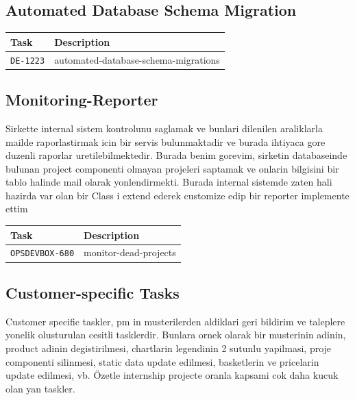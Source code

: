 \subsection*{Automated Database Schema Migration}
\begin{table}[H]
\centering
\begin{tabular}{p{4cm} p{10cm}}
\toprule
\textbf{Task} & \textbf{Description} \\
\midrule
\texttt{DE-1223} & automated-database-schema-migrations \\
\bottomrule
\end{tabular}
\end{table}


\subsection*{Monitoring-Reporter}

Sirkette internal sistem kontrolunu saglamak ve bunlari dilenilen araliklarla mailde raporlastirmak icin bir servis bulunmaktadir ve burada ihtiyaca gore duzenli raporlar uretilebilmektedir.
Burada benim gorevim, sirketin databaseinde bulunan project componenti olmayan projeleri saptamak ve onlarin bilgisini bir tablo halinde mail olarak yonlendirmekti.
Burada internal sistemde zaten hali hazirda var olan bir Class i extend ederek customize edip bir reporter implemente ettim

\begin{table}[H]
\centering
\begin{tabular}{p{4cm} p{10cm}}
\toprule
\textbf{Task} & \textbf{Description} \\
\midrule

\texttt{OPSDEVBOX-680} & monitor-dead-projects \\
\bottomrule
\end{tabular}

\label{tab:opsdevbox-tasks}
\end{table}

\subsection*{Customer-specific Tasks}

Customer specific taskler, pm in musterilerden aldiklari geri bildirim ve taleplere yonelik olusturulan cesitli tasklerdir. 
Bunlara ornek olarak bir musterinin adinin, product adinin degistirilmesi, chartlarin legendinin 2 sutunlu yapilmasi, proje componenti silinmesi, static data update edilmesi, basketlerin ve pricelarin update edilmesi, vb.   
Özetle internship projecte oranla kapsami cok daha kucuk olan yan taskler. 



